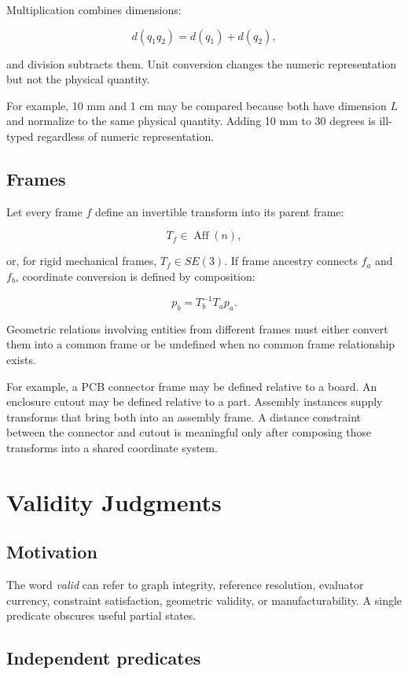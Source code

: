 \documentclass[11pt]{article}
\begin{document}
Multiplication combines dimensions:

\[
d(q_1q_2)=d(q_1)+d(q_2),
\]

and division subtracts them. Unit conversion changes the numeric representation
but not the physical quantity.

For example, 10 mm and 1 cm may be compared because both have dimension $L$ and
normalize to the same physical quantity. Adding 10 mm to 30 degrees is
ill-typed regardless of numeric representation.

\subsection{Frames}

Let every frame $f$ define an invertible transform into its parent frame:

\[
T_f\in\operatorname{Aff}(n),
\]

or, for rigid mechanical frames, $T_f\in SE(3)$. If frame ancestry connects
$f_a$ and $f_b$, coordinate conversion is defined by composition:

\[
p_b=T_b^{-1}T_a p_a.
\]

Geometric relations involving entities from different frames must either
convert them into a common frame or be undefined when no common frame
relationship exists.

For example, a PCB connector frame may be defined relative to a board. An
enclosure cutout may be defined relative to a part. Assembly instances supply
transforms that bring both into an assembly frame. A distance constraint between
the connector and cutout is meaningful only after composing those transforms
into a shared coordinate system.

\section{Validity Judgments}

\subsection{Motivation}

The word \emph{valid} can refer to graph integrity, reference resolution,
evaluator currency, constraint satisfaction, geometric validity, or
manufacturability. A single predicate obscures useful partial states.

\subsection{Independent predicates}
\end{document}
